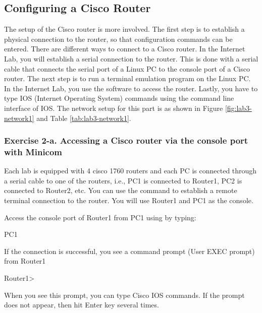 \begin{questions}
\end{questions}
	
\newpage
\subsection{Configuring a Cisco Router}

The setup of the Cisco router is more involved. The first step is to establish a physical connection to the router, so that configuration commands can be entered. There are different ways to connect to a Cisco router. In the Internet Lab, you will establish a serial connection to the router. This is done with a serial cable that connects the serial port of a Linux PC to the console port of a Cisco router. The next step is to run a terminal emulation program on the Linux PC. In the Internet Lab, you use the  software to access the router. Lastly, you have to type IOS (Internet Operating System) commands using the command line interface of IOS. The network setup for this part is as shown in Figure \ref{fig:lab3-network1} and Table \ref{tab:lab3-network1}.

\subsubsection*{Exercise 2-a. Accessing a Cisco router via the console port with Minicom}

Each lab is equipped with 4 cisco 1760 routers and each PC is connected through a serial cable to one of the routers, i.e., PC1 is connected to Router1, PC2 is connected to Router2, etc. You can use the  command to establish a remote terminal connection to the router. You will use Router1 and PC1 as the console.

Access the console port of Router1 from PC1 using  by typing:
\begin{cmdblock}
	PC1%
\end{cmdblock}

If the connection is successful, you see a command prompt (User EXEC prompt) from Router1

\begin{cmdblock}
	Router1>
\end{cmdblock}

When you see this prompt, you can type Cisco IOS commands. If the prompt does not appear, then hit Enter key several times.

